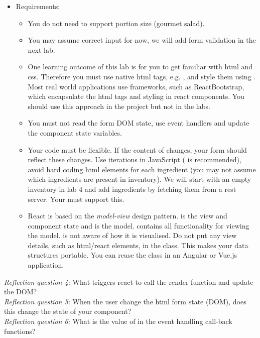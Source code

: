 \documentclass[fleqn, article, a4paper]{memoir}
\begin{document}
\begin{Assignments}
\begin{itemize}
\item Requirements:
\begin{itemize}

  \item You do not need to support portion size (gourmet salad).

  \item You may assume correct input for now, we will add form validation in the next lab.

  \item One learning outcome of this lab is for you to get familiar with html and css. Therefore you must use native html tags, e.g. , and style them using . Most real world applications use frameworks, such as ReactBootstrap, which encapsulate the html tags and styling in react components. You should use this approach in the project but not in the labs.
  \item You must not read the form DOM state, use event handlers and update the component state variables.
  \item Your code must be flexible. If the content of  changes, your form should reflect these changes. Use iterations in JavaScript ( is recommended), avoid hard coding html elements for each ingredient (you may not assume which ingredients are present in inventory). We will start with an empty inventory in lab 4 and add ingredients by fetching them from a rest server. Your  must support this.

  \item React is based on the \emph{model-view} design pattern.  is the view and component state and  is the model.  contains all functionality for viewing the model.  is not aware of how it is visualised. Do not put any view details, such as html/react elements, in the  class. This makes your data structures portable. You can reuse the  class in an Angular or Vue.js application.
\end{itemize}


\end{itemize}
\emph{Reflection question 4:} What triggers react to call the render function and update the DOM?
\\\emph{Reflection question 5:} When the user change the html form state (DOM), does this change the state of your component?
\\\emph{Reflection question 6:} What is the value of  in the event handling call-back functions?


\end{Assignments}
\end{document}
